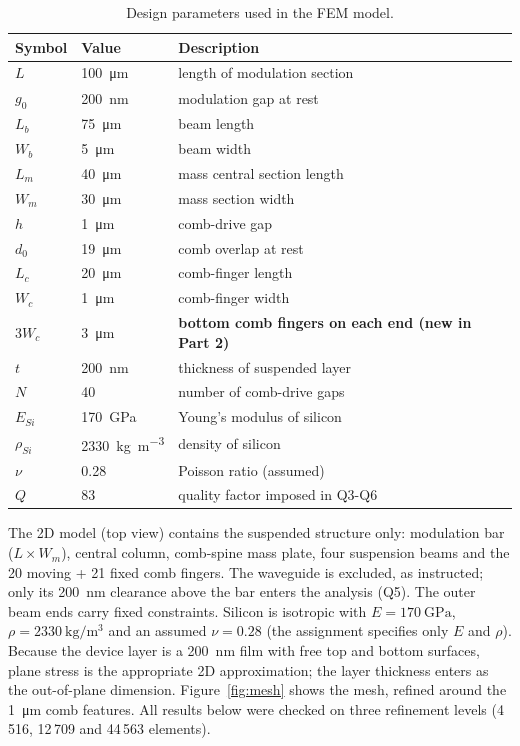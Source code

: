 \documentclass[11pt,a4paper]{article}
\begin{document}
\begin{table}[H]
\centering
\small
\caption{Design parameters used in the FEM model.}
\label{tab:params}
\begin{tabularx}{0.85\textwidth}{l l X}
\toprule
\textbf{Symbol} & \textbf{Value} & \textbf{Description}\\
\midrule
$L$        & \SI{100}{\micro\meter}  & length of modulation section\\
$g_{0}$    & \SI{200}{\nano\meter}   & modulation gap at rest\\
$L_{b}$    & \SI{75}{\micro\meter}   & beam length\\
$W_{b}$    & \SI{5}{\micro\meter}    & beam width\\
$L_{m}$    & \SI{40}{\micro\meter}   & mass central section length\\
$W_{m}$    & \SI{30}{\micro\meter}   & mass section width\\
$h$        & \SI{1}{\micro\meter}    & comb-drive gap\\
$d_{0}$    & \SI{19}{\micro\meter}   & comb overlap at rest\\
$L_{c}$    & \SI{20}{\micro\meter}   & comb-finger length\\
$W_{c}$    & \SI{1}{\micro\meter}    & comb-finger width\\
$3W_{c}$   & \SI{3}{\micro\meter}    & \textbf{bottom comb fingers on each end (new in Part 2)}\\
$t$        & \SI{200}{\nano\meter}   & thickness of suspended layer\\
$N$        & 40                      & number of comb-drive gaps\\
$E_{Si}$   & \SI{170}{\giga\pascal}  & Young's modulus of silicon\\
$\rho_{Si}$& \SI{2330}{\kilo\gram\per\cubic\meter} & density of silicon\\
$\nu$      & 0.28                    & Poisson ratio (assumed)\\
$Q$        & 83                      & quality factor imposed in Q3-Q6\\
\bottomrule
\end{tabularx}
\end{table}

The 2D model (top view) contains the suspended structure only: modulation bar
($L\times W_{m}$), central column, comb-spine mass plate, four suspension
beams and the 20 moving + 21 fixed comb fingers. The waveguide is excluded,
as instructed; only its \SI{200}{\nano\meter} clearance above the bar enters
the analysis (Q5). The outer beam ends carry fixed constraints. Silicon is
isotropic with $E=\SI{170}{\giga\pascal}$, $\rho=\SI{2330}{\kilo\gram\per\cubic\meter}$
and an assumed $\nu=0.28$ (the assignment specifies only $E$ and $\rho$).
Because the device layer is a \SI{200}{\nano\meter} film with free top and
bottom surfaces, plane stress is the appropriate 2D approximation; the layer
thickness enters as the out-of-plane dimension. Figure~\ref{fig:mesh} shows
the mesh, refined around the \SI{1}{\micro\meter} comb features. All results
below were checked on three refinement levels (4\,516, 12\,709 and 44\,563
elements).
\end{document}
